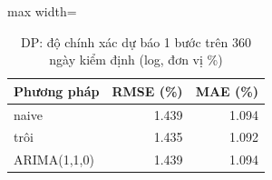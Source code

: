 \begin{table}[H]
\centering\footnotesize
\caption{DP: độ chính xác dự báo 1 bước trên 360 ngày kiểm định (log, đơn vị \%)}\label{tab:tab_b12_11_dp_one_step}
\begin{adjustbox}{max width=\linewidth}
\begin{tabular}{|l|r|r|}
\toprule
Phương pháp & RMSE (\%) & MAE (\%) \\
\midrule
naive & 1.439 & 1.094 \\
trôi & 1.435 & 1.092 \\
ARIMA(1,1,0) & 1.439 & 1.094 \\
\bottomrule
\end{tabular}
\end{adjustbox}
\end{table}
